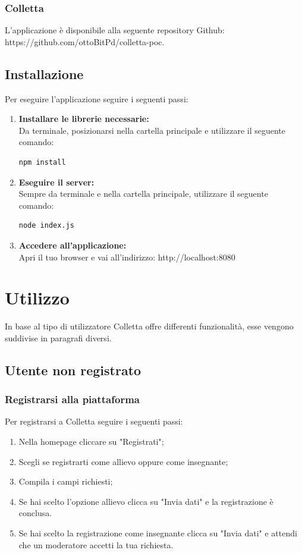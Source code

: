 \documentclass[11pt,a4paper]{article}
\begin{document}
{	\subsubsection{Colletta}		
	L'applicazione è disponibile alla seguente repository Github:
	https://github.com/ottoBitPd/colletta-poc.
	
	\subsection{Installazione}
	Per eseguire l'applicazione seguire i seguenti passi:
	 \begin{enumerate}
	 	\item \textbf{Installare le librerie necessarie:}\\ Da terminale, posizionarsi nella cartella principale e utilizzare il seguente comando:\begin{lstlisting}[numbers=none]
	 	npm install
	 	\end{lstlisting}
	 	\item \textbf{Eseguire il server:}\\ Sempre da terminale e nella cartella principale, utilizzare il seguente comando:\begin{lstlisting}[numbers=none]
	 	node index.js
	 	\end{lstlisting}
	 	\item \textbf{Accedere all'applicazione:}\\ Apri il tuo browser e vai all'indirizzo: http://localhost:8080
	 \end{enumerate}
 
 \newpage
	\section{Utilizzo}	
	In base al tipo di utilizzatore Colletta offre differenti funzionalità, esse vengono suddivise in paragrafi diversi.
	
	\subsection{Utente non registrato}
		\subsubsection{Registrarsi alla piattaforma}
		Per registrarsi a Colletta seguire i seguenti passi:
		\begin{enumerate}
			\item Nella homepage cliccare su "Registrati";
			\item Scegli se registrarti come allievo oppure come insegnante;
			\item Compila i campi richiesti;
			\item Se hai scelto l'opzione allievo clicca su "Invia dati" e la registrazione è conclusa.
			\item Se hai scelto la registrazione come insegnante clicca su "Invia dati" e attendi che un moderatore accetti la tua richiesta.
		\end{enumerate}
}
\end{document}
